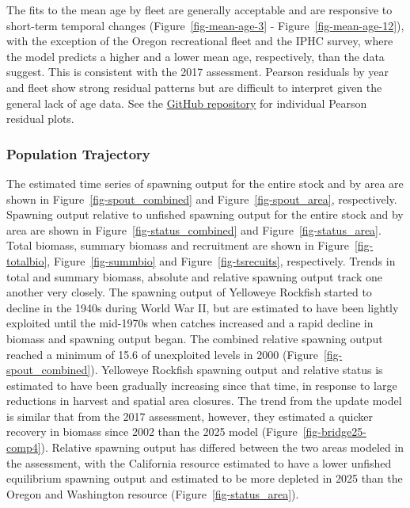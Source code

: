 \documentclass[
]{scrartcl}
\begin{document}
The fits to the mean age by fleet are generally acceptable and are
responsive to short-term temporal changes (Figure~\ref{fig-mean-age-3} -
Figure~\ref{fig-mean-age-12}), with the exception of the Oregon
recreational fleet and the IPHC survey, where the model predicts a
higher and a lower mean age, respectively, than the data suggest. This
is consistent with the 2017 assessment. Pearson residuals by year and
fleet show strong residual patterns but are difficult to interpret given
the general lack of age data. See the
\href{https://github.com/rclairer/Sebastes_ruberrimus_2025}{GitHub
repository} for individual Pearson residual plots.

\subsubsection{Population Trajectory}\label{population-trajectory}

The estimated time series of spawning output for the entire stock and by
area are shown in Figure~\ref{fig-spout_combined} and
Figure~\ref{fig-spout_area}, respectively. Spawning output relative to
unfished spawning output for the entire stock and by area are shown in
Figure~\ref{fig-status_combined} and Figure~\ref{fig-status_area}. Total
biomass, summary biomass and recruitment are shown in
Figure~\ref{fig-totalbio}, Figure~\ref{fig-summbio} and
Figure~\ref{fig-tsrecuits}, respectively. Trends in total and summary
biomass, absolute and relative spawning output track one another very
closely. The spawning output of Yelloweye Rockfish started to decline in
the 1940s during World War II, but are estimated to have been lightly
exploited until the mid-1970s when catches increased and a rapid decline
in biomass and spawning output began. The combined relative spawning
output reached a minimum of 15.6 of unexploited levels in 2000
(Figure~\ref{fig-spout_combined}). Yelloweye Rockfish spawning output
and relative status is estimated to have been gradually increasing since
that time, in response to large reductions in harvest and spatial area
closures. The trend from the update model is similar that from the 2017
assessment, however, they estimated a quicker recovery in biomass since
2002 than the 2025 model (Figure~\ref{fig-bridge25-comp4}). Relative
spawning output has differed between the two areas modeled in the
assessment, with the California resource estimated to have a lower
unfished equilibrium spawning output and estimated to be more depleted
in 2025 than the Oregon and Washington resource
(Figure~\ref{fig-status_area}).
\end{document}
